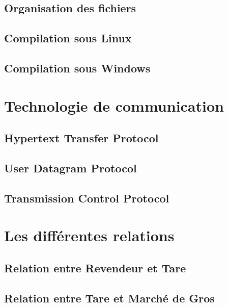 \documentclass[a4paper, 11pt]{report}
\begin{document}
\subsection{Organisation des fichiers}


\subsection{Compilation sous Linux}


\subsection{Compilation sous Windows}


\section{Technologie de communication}

\subsection{Hypertext Transfer Protocol}


\subsection{User Datagram Protocol}


\subsection{Transmission Control Protocol}


\section{Les différentes relations}


\subsection{Relation entre Revendeur et Tare}


\subsection{Relation entre Tare et Marché de Gros}

\end{document}
